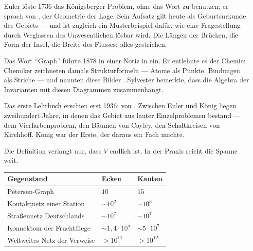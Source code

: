 \begin{geschichte}
Euler löste 1736 das Königsberger Problem, ohne das Wort zu benutzen; er sprach von , der Geometrie der Lage. Sein Aufsatz  gilt heute als Geburtsurkunde des Gebiets --- und ist zugleich ein Musterbeispiel dafür, wie eine Fragestellung durch Weglassen des Unwesentlichen lösbar wird. Die Längen der Brücken, die Form der Insel, die Breite des Flusses: alles gestrichen.

Das Wort \enquote{Graph} führte  1878 in einer Notiz in  ein. Er entlehnte es der Chemie: Chemiker zeichneten damals Strukturformeln --- Atome als Punkte, Bindungen als Striche --- und nannten diese Bilder . Sylvester bemerkte, dass die Algebra der Invarianten mit diesen Diagrammen zusammenhängt.

Das erste Lehrbuch erschien erst 1936:  von . Zwischen Euler und König liegen zweihundert Jahre, in denen das Gebiet aus lauter Einzelproblemen bestand --- dem Vierfarbenproblem, den Bäumen von Cayley, den Schaltkreisen von Kirchhoff. König war der Erste, der daraus ein Fach machte.
\end{geschichte}

\begin{forschung}
Die Definition verlangt nur, dass $V$ endlich ist. In der Praxis reicht die Spanne weit.

\begin{center}
{\small
\renewcommand{\arraystretch}{1.42}
\begin{tabular}{@{}P{3.2cm}P{2.2cm}P{2.6cm}@{}}
\toprule
\textbf{Gegenstand} & \textbf{Ecken} & \textbf{Kanten}\\
\midrule
Petersen-Graph & $10$ & $15$\\
Kontaktnetz einer Station & $\sim 10^2$ & $\sim 10^3$\\
Straßennetz Deutschlands & $\sim 10^7$ & $\sim 10^7$\\
Konnektom der Fruchtfliege & $\sim 1{,}4 \cdot 10^5$ & $\sim 5 \cdot 10^7$\\
Weltweites Netz der Verweise & $> 10^{11}$ & $> 10^{12}$\\
\bottomrule
\end{tabular}}
\end{center}

\begin{center}
\begin{minipage}{0.88\textwidth}
\end{minipage}
\end{center}
\end{forschung}

